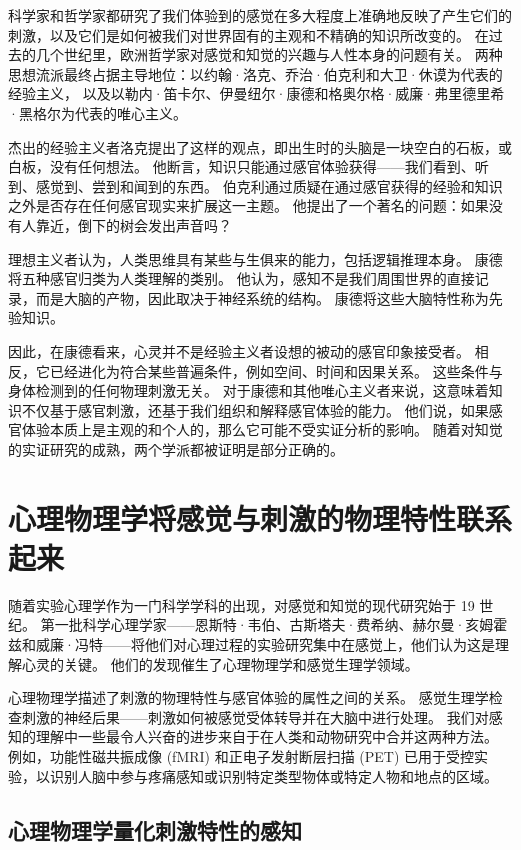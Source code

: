 科学家和哲学家都研究了我们体验到的感觉在多大程度上准确地反映了产生它们的刺激，以及它们是如何被我们对世界固有的主观和不精确的知识所改变的。 
在过去的几个世纪里，欧洲哲学家对感觉和知觉的兴趣与人性本身的问题有关。 
两种思想流派最终占据主导地位：以约翰·洛克、乔治·伯克利和大卫·休谟为代表的经验主义，
以及以勒内·笛卡尔、伊曼纽尔·康德和格奥尔格·威廉·弗里德里希·黑格尔为代表的唯心主义。


杰出的经验主义者洛克提出了这样的观点，即出生时的头脑是一块空白的石板，或白板，没有任何想法。 
他断言，知识只能通过感官体验获得——我们看到、听到、感觉到、尝到和闻到的东西。 
伯克利通过质疑在通过感官获得的经验和知识之外是否存在任何感官现实来扩展这一主题。 
他提出了一个著名的问题：如果没有人靠近，倒下的树会发出声音吗？


理想主义者认为，人类思维具有某些与生俱来的能力，包括逻辑推理本身。 
康德将五种感官归类为人类理解的类别。 
他认为，感知不是我们周围世界的直接记录，而是大脑的产物，因此取决于神经系统的结构。 
康德将这些大脑特性称为先验知识。


因此，在康德看来，心灵并不是经验主义者设想的被动的感官印象接受者。 
相反，它已经进化为符合某些普遍条件，例如空间、时间和因果关系。 
这些条件与身体检测到的任何物理刺激无关。 
对于康德和其他唯心主义者来说，这意味着知识不仅基于感官刺激，还基于我们组织和解释感官体验的能力。 
他们说，如果感官体验本质上是主观的和个人的，那么它可能不受实证分析的影响。
随着对知觉的实证研究的成熟，两个学派都被证明是部分正确的。


\section{心理物理学将感觉与刺激的物理特性联系起来}
随着实验心理学作为一门科学学科的出现，对感觉和知觉的现代研究始于 19 世纪。 
第一批科学心理学家——恩斯特·韦伯、古斯塔夫·费希纳、赫尔曼·亥姆霍兹和威廉·冯特——将他们对心理过程的实验研究集中在感觉上，他们认为这是理解心灵的关键。 
他们的发现催生了心理物理学和感觉生理学领域。


心理物理学描述了刺激的物理特性与感官体验的属性之间的关系。 
感觉生理学检查刺激的神经后果——刺激如何被感觉受体转导并在大脑中进行处理。 
我们对感知的理解中一些最令人兴奋的进步来自于在人类和动物研究中合并这两种方法。 
例如，功能性磁共振成像 (fMRI) 和正电子发射断层扫描 (PET) 已用于受控实验，以识别人脑中参与疼痛感知或识别特定类型物体或特定人物和地点的区域。


\subsection{心理物理学量化刺激特性的感知}

